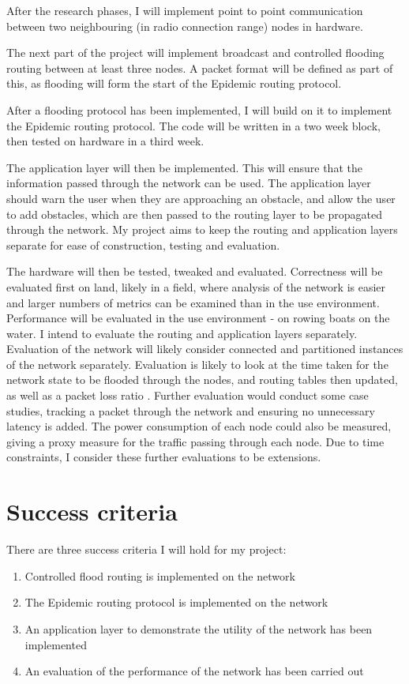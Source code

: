 \documentclass[10pt, a4paper]{article}
\begin{document}
After the research phases, I will implement point to point communication between two neighbouring (in radio connection range) nodes in hardware. \par

The next part of the project will implement broadcast and controlled flooding routing between at least three nodes. A packet format will be defined as part of this, as flooding will form the start of the Epidemic routing protocol.\par 

After a flooding protocol has been implemented, I will build on it to implement the Epidemic routing protocol. The code will be written in a two week block, then tested on hardware in a third week. \par

The application layer will then be implemented. This will ensure that the information passed through the network can be used. The application layer should warn the user when they are approaching an obstacle, and allow the user to add obstacles, which are then passed to the routing layer to be propagated through the network. My project aims to keep the routing and application layers separate for ease of construction, testing and evaluation.\par

The hardware will then be tested, tweaked and evaluated. Correctness will be evaluated first on land, likely in a field, where analysis of the network is easier and larger numbers of metrics can be examined than in the use environment. Performance will be evaluated in the use environment - on rowing boats on the water. I intend to evaluate the routing and application layers separately. Evaluation of the network will likely consider connected and partitioned instances of the network separately. Evaluation is likely to look at the time taken for the network state to be flooded through the nodes, and routing tables then updated, as well as a packet loss ratio \cite{itu}. Further evaluation would conduct some case studies, tracking a packet through the network and ensuring no unnecessary latency is added. The power consumption of each node could also be measured, giving a proxy measure for the traffic passing through each node. Due to time constraints, I consider these further evaluations to be extensions.


\section{Success criteria}
There are three success criteria I will hold for my project:
\begin{enumerate}
\item Controlled flood routing is implemented on the network
\item The Epidemic routing protocol is implemented on the network 
\item An application layer to demonstrate the utility of the network has been implemented
\item An evaluation of the performance of the network has been carried out
\end{enumerate}
\end{document}
